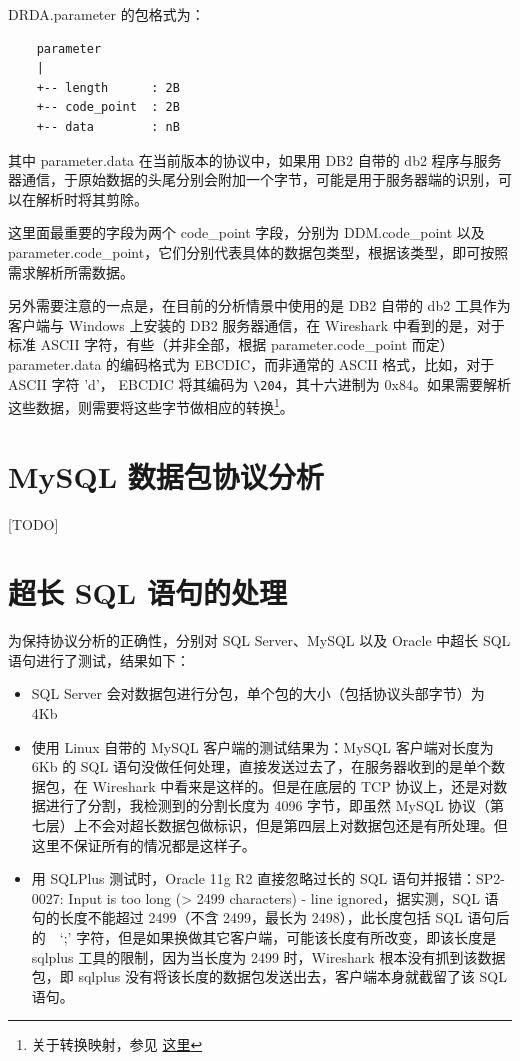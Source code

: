 {\cf DRDA.parameter} 的包格式为：

\begin{lstlisting}
    parameter
    |
    +-- length      : 2B
    +-- code_point  : 2B
    +-- data        : nB
\end{lstlisting}

其中 {\cf parameter.data} 在当前版本的协议中，如果用 DB2 自带的 {\cmdf db2} 程序与服务器通信，于原始数据的头尾分别会附加一个字节，可能是用于服务器端的识别，可以在解析时将其剪除。

这里面最重要的字段为两个 {\cf code\_point} 字段，分别为 {\cf DDM.code\_point} 以及 {\cf parameter.code\_point}，它们分别代表具体的数据包类型，根据该类型，即可按照需求解析所需数据。

另外需要注意的一点是，在目前的分析情景中使用的是 DB2 自带的 {\cmdf db2} 工具作为客户端与 Windows 上安装的 DB2 服务器通信，在 Wireshark 中看到的是，对于标准 ASCII 字符，有些（并非全部，根据 {\cf parameter.code\_point} 而定） {\cf parameter.data} 的编码格式为 EBCDIC，而非通常的 ASCII 格式，比如，对于 ASCII 字符 {\cf 'd'}， EBCDIC 将其编码为 {\cf \verb|\204|}，其十六进制为 {\cf 0x84}。如果需要解析这些数据，则需要将这些字节做相应的转换\footnote{关于转换映射，参见 \href{https://publib.boulder.ibm.com/infocenter/comphelp/v8v101/index.jsp?topic=\%2Fcom.ibm.xlf101a.doc\%2Fxlflr\%2Fasciit.htm}{这里}}。

\section{MySQL 数据包协议分析}
[TODO]

\section{超长 SQL 语句的处理}
为保持协议分析的正确性，分别对 SQL Server、MySQL 以及 Oracle 中超长 SQL 语句进行了测试，结果如下：

\begin{itemize}
    \item SQL Server 会对数据包进行分包，单个包的大小（包括协议头部字节）为 4Kb
    \item 使用 Linux 自带的 MySQL 客户端的测试结果为：MySQL 客户端对长度为 6Kb 的 SQL 语句没做任何处理，直接发送过去了，在服务器收到的是单个数据包，在 Wireshark 中看来是这样的。但是在底层的 TCP 协议上，还是对数据进行了分割，我检测到的分割长度为 4096 字节，即虽然 MySQL 协议（第七层）上不会对超长数据包做标识，但是第四层上对数据包还是有所处理。但这里不保证所有的情况都是这样子。
    \item 用 SQLPlus 测试时，Oracle 11g R2 直接忽略过长的 SQL 语句并报错：{\cf SP2-0027: Input is too long (> 2499 characters) - line ignored}，据实测，SQL 语句的长度不能超过 2499（不含 2499，最长为 2498），此长度包括 SQL 语句后的　`{\cf ;}' 字符，但是如果换做其它客户端，可能该长度有所改变，即该长度是 sqlplus 工具的限制，因为当长度为 2499 时，Wireshark 根本没有抓到该数据包，即 sqlplus 没有将该长度的数据包发送出去，客户端本身就截留了该 SQL 语句。
\end{itemize}
